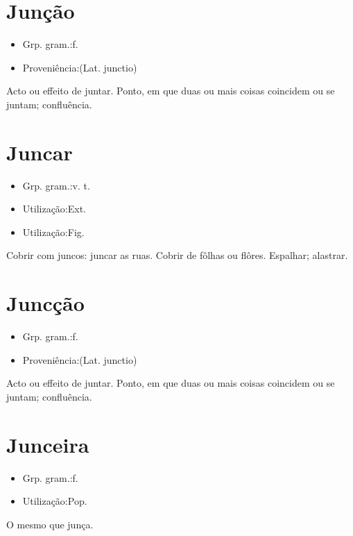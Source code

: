 \documentclass{article}
\begin{document}
\section{Junção}
\begin{itemize}
\item {Grp. gram.:f.}
\end{itemize}
\begin{itemize}
\item {Proveniência:(Lat. \textunderscore junctio\textunderscore )}
\end{itemize}
Acto ou effeito de juntar.
Ponto, em que duas ou mais coisas coincidem ou se juntam; confluência.
\section{Juncar}
\begin{itemize}
\item {Grp. gram.:v. t.}
\end{itemize}
\begin{itemize}
\item {Utilização:Ext.}
\end{itemize}
\begin{itemize}
\item {Utilização:Fig.}
\end{itemize}
Cobrir com juncos: \textunderscore juncar as ruas\textunderscore .
Cobrir de fôlhas ou flôres.
Espalhar; alastrar.
\section{Juncção}
\begin{itemize}
\item {Grp. gram.:f.}
\end{itemize}
\begin{itemize}
\item {Proveniência:(Lat. \textunderscore junctio\textunderscore )}
\end{itemize}
Acto ou effeito de juntar.
Ponto, em que duas ou mais coisas coincidem ou se juntam; confluência.
\section{Junceira}
\begin{itemize}
\item {Grp. gram.:f.}
\end{itemize}
\begin{itemize}
\item {Utilização:Pop.}
\end{itemize}
O mesmo que \textunderscore junça\textunderscore .
\end{document}
